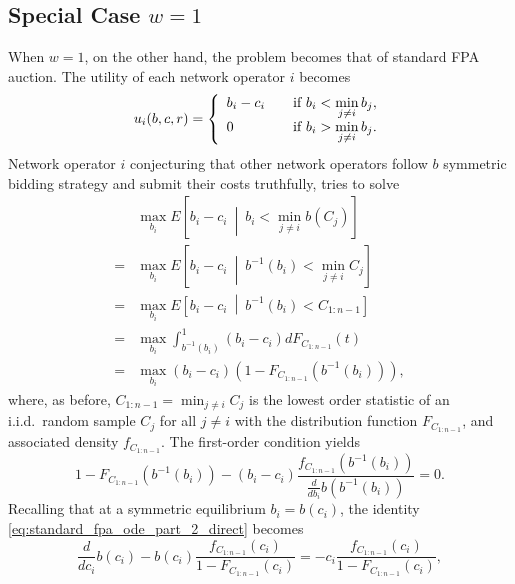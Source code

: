 \subsection{Special Case $w=1$} %
\label{sub:special_case_w_1__direct}
When $w=1$, on the other hand, the problem becomes that of standard FPA auction. The utility of each network operator $i$ becomes
\begin{equation}
	\label{eq:sellers_utility_w_1_direct}
	u_i(b,c,r) = \left\{
	\begin{array}{l l}
		b_i-c_i & \quad\text{if } b_i < \displaystyle\min_{j\neq i}b_j,\\
		0 & \quad\text{if } b_i > \displaystyle\min_{j\neq i}b_j.
	\end{array}\right.
\end{equation}
Network operator $i$ conjecturing that other network operators follow $b$ symmetric bidding strategy and submit their costs truthfully, tries to solve
\begin{align}
	\label{eq:standard_fpa_ode_part_1_direct}
	&\max_{b_i}E \left[ b_i-c_i \:\middle\vert\: b_i < \min_{j\neq i}b(C_j) \right] \nonumber\\
	= &\max_{b_i}E \left[ b_i-c_i \:\middle\vert\: b^{-1}(b_i) < \min_{j\neq i}C_j \right] \nonumber\\
	= &\max_{b_i}E \left[ b_i-c_i \:\middle\vert\: b^{-1}(b_i) < C_{1:n-1} \right] \nonumber\\
	= &\max_{b_i} \int_{b^{-1}(b_i)}^{1} (b_i-c_i)dF_{C_{1:n-1}}(t) \nonumber\\
	= &\max_{b_i} (b_i-c_i)(1 - F_{C_{1:n-1}}(b^{-1}(b_i))),
\end{align}
where, as before, $C_{1:n-1} = \min_{j\neq i}C_j$ is the lowest order statistic of an i.i.d.~random sample $C_j$ for all $j\neq i$ with the distribution function $F_{C_{1:n-1}}$, and associated density $f_{C_{1:n-1}}$. The first-order condition yields
\begin{equation}
	\label{eq:standard_fpa_ode_part_2_direct}
	1 - F_{C_{1:n-1}}(b^{-1}(b_i)) - (b_i - c_i)\frac{f_{C_{1:n-1}}(b^{-1}(b_i))}{\frac{d}{db_i}b(b^{-1}(b_i))} = 0.
\end{equation}
Recalling that at a symmetric equilibrium $b_i=b(c_i)$, the identity \eqref{eq:standard_fpa_ode_part_2_direct} becomes
\begin{equation}
	\label{eq:standard_fpa_ode_part_3_direct}
	\frac{d}{dc_i}b(c_i) - b(c_i)\frac{f_{C_{1:n-1}}(c_i)}{1 - F_{C_{1:n-1}}(c_i)} = -c_i \frac{f_{C_{1:n-1}}(c_i)}{1 - F_{C_{1:n-1}}(c_i)},
\end{equation}

